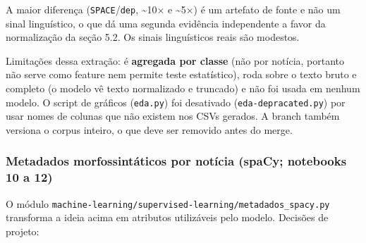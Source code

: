\documentclass[
  brazilian,
  11pt,
]{article}
\begin{document}
A maior diferença (\texttt{SPACE}/\texttt{dep}, \textasciitilde10× e \textasciitilde5×) é um artefato de fonte e não um sinal linguístico, o que dá uma segunda evidência independente a favor da normalização da seção 5.2. Os sinais linguísticos reais são modestos.

Limitações dessa extração: é \textbf{agregada por classe} (não por notícia, portanto não serve como feature nem permite teste estatístico), roda sobre o texto bruto e completo (o modelo vê texto normalizado e truncado) e não foi usada em nenhum modelo. O script de gráficos (\texttt{eda.py}) foi desativado (\texttt{eda-depracated.py}) por usar nomes de colunas que não existem nos CSVs gerados. A branch também versiona o corpus inteiro, o que deve ser removido antes do merge.

\subsubsection{Metadados morfossintáticos por notícia (spaCy; notebooks 10 a 12)}\label{metadados-morfossintuxe1ticos-por-notuxedcia-spacy-notebooks-10-a-12}

O módulo \texttt{machine-learning/supervised-learning/metadados\_spacy.py} transforma a ideia acima em atributos utilizáveis pelo modelo. Decisões de projeto:
\end{document}
